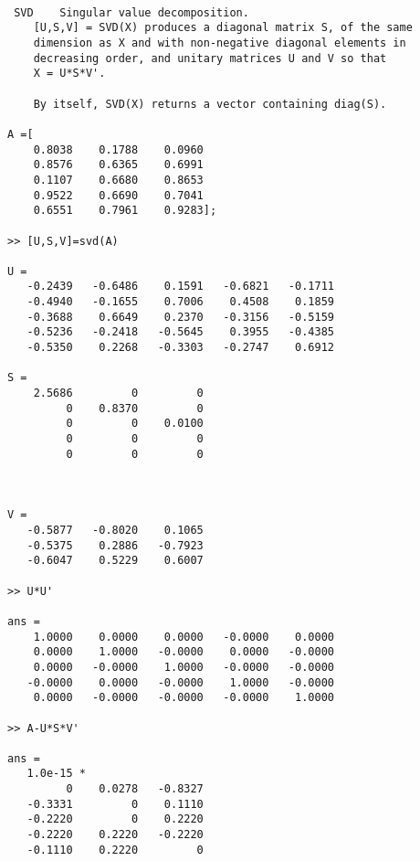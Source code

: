 \documentclass[letterpaper]{article}
\begin{document}
\begin{verbatim}

 SVD 	Singular value decomposition.
 	[U,S,V] = SVD(X) produces a diagonal matrix S, of the same
 	dimension as X and with non-negative diagonal elements in
 	decreasing order, and unitary matrices U and V so that
 	X = U*S*V'.

  	By itself, SVD(X) returns a vector containing diag(S).

A =[
    0.8038    0.1788    0.0960
    0.8576    0.6365    0.6991
    0.1107    0.6680    0.8653
    0.9522    0.6690    0.7041
    0.6551    0.7961    0.9283];

>> [U,S,V]=svd(A)

U =
   -0.2439   -0.6486    0.1591   -0.6821   -0.1711
   -0.4940   -0.1655    0.7006    0.4508    0.1859
   -0.3688    0.6649    0.2370   -0.3156   -0.5159
   -0.5236   -0.2418   -0.5645    0.3955   -0.4385
   -0.5350    0.2268   -0.3303   -0.2747    0.6912

S =
    2.5686         0         0
         0    0.8370         0
         0         0    0.0100
         0         0         0
         0         0         0



V =
   -0.5877   -0.8020    0.1065
   -0.5375    0.2886   -0.7923
   -0.6047    0.5229    0.6007

>> U*U'

ans =
    1.0000    0.0000    0.0000   -0.0000    0.0000
    0.0000    1.0000   -0.0000    0.0000   -0.0000
    0.0000   -0.0000    1.0000   -0.0000   -0.0000
   -0.0000    0.0000   -0.0000    1.0000   -0.0000
    0.0000   -0.0000   -0.0000   -0.0000    1.0000

>> A-U*S*V'

ans =
   1.0e-15 *
         0    0.0278   -0.8327
   -0.3331         0    0.1110
   -0.2220         0    0.2220
   -0.2220    0.2220   -0.2220
   -0.1110    0.2220         0

\end{verbatim}

\vspace*{.5cm}


\vspace*{.5cm}


\end{document}

